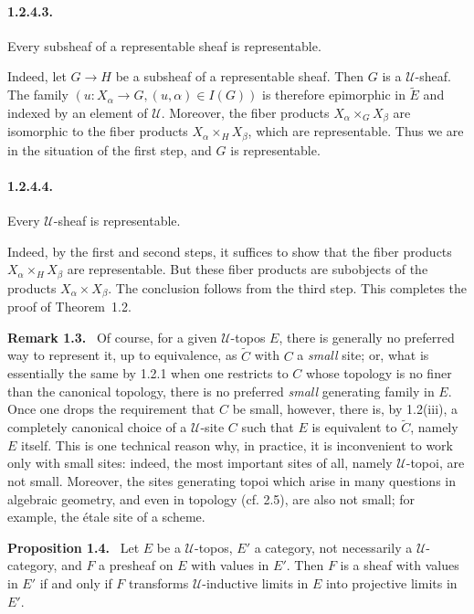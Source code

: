 \documentclass[11pt]{article}
\newcommand{\U}{\mathcal{U}}
\newenvironment{statement}[1]{\par\medskip\noindent\textbf{#1.}\ }{\par\medskip}
\newenvironment{remarktext}[1]{\par\medskip\noindent\textbf{#1.}\ }{\par\medskip}
\begin{document}
\paragraph{1.2.4.3.} Every subsheaf of a representable sheaf is representable.

Indeed, let \(G\to H\) be a subsheaf of a representable sheaf. Then \(G\) is a \(\U\)-sheaf. The family \((u:X_\alpha\to G,(u,\alpha)\in I(G))\) is therefore epimorphic in \(\widetilde E\) and indexed by an element of \(\U\). Moreover, the fiber products \(X_\alpha\times_GX_\beta\) are isomorphic to the fiber products \(X_\alpha\times_HX_\beta\), which are representable. Thus we are in the situation of the first step, and \(G\) is representable.

\paragraph{1.2.4.4.} Every \(\U\)-sheaf is representable.

Indeed, by the first and second steps, it suffices to show that the fiber products \(X_\alpha\times_HX_\beta\) are representable. But these fiber products are subobjects of the products \(X_\alpha\times X_\beta\). The conclusion follows from the third step. This completes the proof of Theorem~1.2.

\begin{remarktext}{Remark 1.3}
Of course, for a given \(\U\)-topos \(E\), there is generally no preferred way to represent it, up to equivalence, as \(\widetilde C\) with \(C\) a \emph{small} site; or, what is essentially the same by 1.2.1 when one restricts to \(C\) whose topology is no finer than the canonical topology, there is no preferred \emph{small} generating family in \(E\). Once one drops the requirement that \(C\) be small, however, there is, by 1.2(iii), a completely canonical choice of a \(\U\)-site \(C\) such that \(E\) is equivalent to \(\widetilde C\), namely \(E\) itself. This is one technical reason why, in practice, it is inconvenient to work only with small sites: indeed, the most important sites of all, namely \(\U\)-topoi, are not small. Moreover, the sites generating topoi which arise in many questions in algebraic geometry, and even in topology (cf. 2.5), are also not small; for example, the \'etale site of a scheme.
\end{remarktext}

\begin{statement}{Proposition 1.4}
Let \(E\) be a \(\U\)-topos, \(E'\) a category, not necessarily a \(\U\)-category, and \(F\) a presheaf on \(E\) with values in \(E'\). Then \(F\) is a sheaf with values in \(E'\) if and only if \(F\) transforms \(\U\)-inductive limits in \(E\) into projective limits in \(E'\).
\end{statement}
\end{document}
